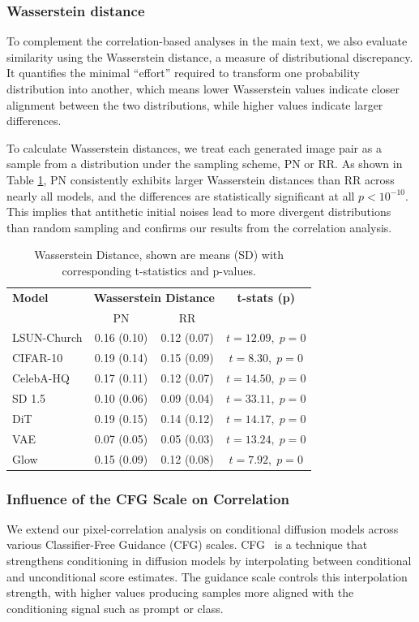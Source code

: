 \documentclass[12pt]{article}
\newcommand{\0}{\mathbf{0}}
\begin{document}
\subsubsection{Wasserstein distance}

To complement the correlation-based analyses in the main text, we also evaluate similarity using the Wasserstein distance, a measure of distributional discrepancy. It quantifies the minimal “effort” required to transform one probability distribution into another, which means lower Wasserstein values indicate closer alignment between the two distributions, while higher values indicate larger differences.

To calculate Wasserstein distances, we treat each generated image pair as a sample from a distribution under the sampling scheme, PN or RR. As shown in Table \ref{tab:full_wasserstein_results}, PN consistently exhibits larger Wasserstein distances than RR across nearly all models, and the differences are statistically significant at all $p < 10^{-10}$. This implies that antithetic initial noises lead to more divergent distributions than random sampling and confirms our results from the correlation analysis.

\begin{table}[htbp]
\centering
\caption{Wasserstein Distance, shown are means (SD) with corresponding t-statistics and p-values.}
\label{tab:full_wasserstein_results}
\begin{tabular}{l|cc|c}
\toprule
\textbf{Model} & \multicolumn{2}{c|}{\textbf{Wasserstein Distance}} & \textbf{t-stats (p)} \\
 & PN & RR &  \\
\hline
LSUN-Church & 0.16 (0.10) & 0.12 (0.07) & $t=12.09,\;p=0$ \\
CIFAR-10 & 0.19 (0.14) & 0.15 (0.09) & $t=8.30,\;p=0$ \\
CelebA-HQ & 0.17 (0.11) & 0.12 (0.07) & $t=14.50,\;p=0$ \\
\midrule
SD 1.5 & 0.10 (0.06) & 0.09 (0.04) & $t=33.11,\;p=0$ \\
DiT & 0.19 (0.15) & 0.14 (0.12) & $t=14.17,\;p=0$ \\
\midrule
VAE & 0.07 (0.05) & 0.05 (0.03) & $t=13.24,\;p=0$ \\
Glow & 0.15 (0.09) & 0.12 (0.08) & $t=7.92,\;p=0$ \\
\bottomrule
\end{tabular}
\end{table}


\subsubsection{Influence of the CFG Scale on Correlation}
We extend our pixel-correlation analysis on conditional diffusion models across various Classifier-Free Guidance (CFG) scales. CFG~\citep{ho2022classifier} is a technique that strengthens conditioning in diffusion models by interpolating between conditional and unconditional score estimates. The guidance scale controls this interpolation strength, with higher values producing samples more aligned with the conditioning signal such as prompt or class.
\end{document}
